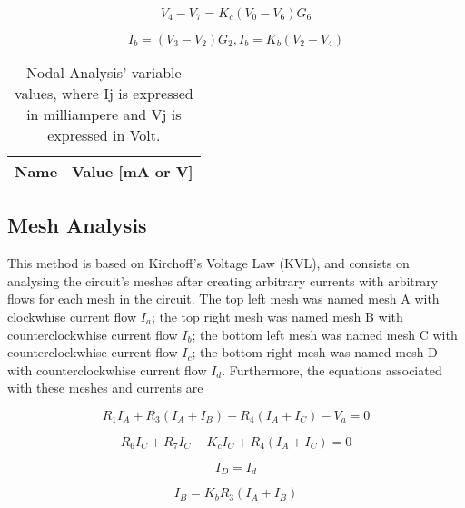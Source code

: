 \begin{equation}
  V_4 - V_7 = K_c(V_0 - V_6)G_6
  \label{eq:kvl7}
\end{equation}

\begin{equation}
  I_b = (V_3 - V_2)G_2 , I_b = K_b(V_2 - V_4)
  \label{eq:kvl8}
\end{equation}

\begin{table}[h]
  \centering
  \begin{tabular}{|l|r|}
    \hline    
    {\bf Name} & {\bf Value [mA or V]} \\ \hline
    
  \end{tabular}
  \caption{Nodal Analysis' variable values, where Ij is expressed in milliampere and Vj is expressed in Volt.}
  \label{tab:Nodal}
\end{table}

\subsection{Mesh Analysis}

This method is based on Kirchoff's Voltage Law (KVL), and consists on analysing the circuit's meshes
after creating arbitrary currents with arbitrary flows for each mesh in the circuit. The top left mesh
was named mesh A with clockwhise current flow $I_a$; the top right mesh was named mesh B with counterclockwhise
current flow $I_b$; the bottom left mesh was named mesh C with counterclockwhise current flow $I_c$; the bottom right
mesh was named mesh D with counterclockwhise current flow $I_d$. Furthermore, the equations associated with these meshes
and currents are

\begin{equation}
  R_1 I_A + R_3(I_A + I_B) + R_4(I_A + I_C) - V_a = 0
  \label{eq:kvl}
\end{equation}

\begin{equation}
R_6 I_C + R_7 I_C - K_c I_C + R_4(I_A + I_C) = 0
  \label{eq:kvl2}
\end{equation}

\begin{equation}
  I_D = I_d
  \label{eq:kvl3}
\end{equation}

\begin{equation}
  I_B = K_b R_3(I_A + I_B)
  \label{eq:kvl4}
\end{equation}

